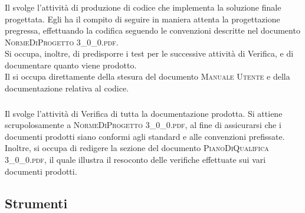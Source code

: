 		\subsubsection{\Progr}
		Il \textit{\Progr} svolge l'attività di produzione di codice che implementa la soluzione finale progettata. Egli ha il compito di seguire in maniera attenta la progettazione pregressa, effettuando la codifica seguendo le convenzioni descritte nel documento \textsc{NormeDiProgetto 3\_0\_0.pdf}.\\
		Si occupa, inoltre, di predisporre i test per le successive attività di Verifica, e di documentare quanto viene prodotto.\\
		Il \textit{\Progr} si occupa direttamente della stesura del documento \textsc{Manuale Utente} e della documentazione relativa al codice.
		
		\subsubsection{\Ver}
		Il \textit{\Ver} svolge l'attività di Verifica di tutta la documentazione prodotta. Si attiene scrupolosamente a \textsc{NormeDiProgetto 3\_0\_0.pdf}, al fine di assicurarsi che i documenti prodotti siano conformi agli standard e alle convenzioni prefissate.\\
		Inoltre, si occupa di redigere la sezione del documento \textsc{PianoDiQualifica 3\_0\_0.pdf}, il quale illustra il resoconto delle verifiche effettuate sui vari documenti prodotti.

	\subsection{Strumenti}

